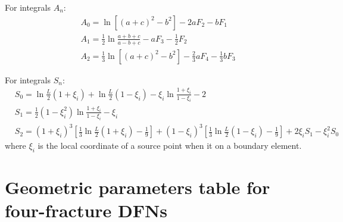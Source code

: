 \documentclass[num-refs]{wiley-networks}
\begin{document}
For integrals $A_n$:
\begin{eqnarray}
    & A_0=\ln \left[ \left( a+c \right) ^2-b^2 \right] -2aF_2-bF_1
    \\
    &A_1=\frac{1}{2}\ln \frac{a+b+c}{a-b+c}-aF_3-\frac{1}{2}F_2
    \\
    &A_2=\frac{1}{3}\ln \left[ \left( a+c \right) ^2-b^2 \right] -\frac{2}{3}aF_4-\frac{1}{3}bF_3
\end{eqnarray}

For integrals $S_n$:
\begin{eqnarray}
    &S_0=\ln \frac{L}{2}\left( 1+\xi _i \right) +\ln \frac{L}{2}\left( 1-\xi _i \right) -\xi _i\ln \frac{1+\xi _i}{1-\xi _i}-2
    \\
    &S_1=\frac{1}{2}\left( 1-\xi _{i}^{2} \right) \ln \frac{1+\xi _i}{1-\xi _i}-\xi _i
    \\
    &S_2=\left( 1+\xi _i \right) ^3\left[ \frac{1}{3}\ln \frac{L}{2}\left( 1+\xi _i \right) -\frac{1}{9} \right] +\left( 1-\xi _i \right) ^3\left[ \frac{1}{3}\ln \frac{L}{2}\left( 1-\xi _i \right) -\frac{1}{9} \right] +2\xi _iS_1-\xi _{i}^{2}S_0
\end{eqnarray}
where $\xi _i$ is the local coordinate of a source point when it on a boundary element.

\section{Geometric parameters table for four-fracture DFNs}
\label{AppendixC}
\end{document}
